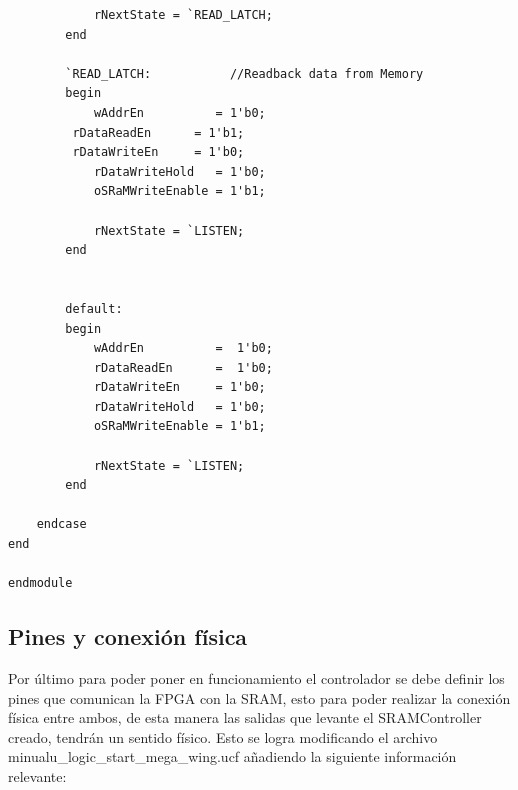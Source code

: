 \documentclass[10pt]{article}
\begin{document}
\begin{lstlisting}
			rNextState = `READ_LATCH;
		end

		`READ_LATCH:           //Readback data from Memory
		begin
			wAddrEn          = 1'b0;
         rDataReadEn      = 1'b1;
         rDataWriteEn     = 1'b0;
			rDataWriteHold   = 1'b0;
			oSRaMWriteEnable = 1'b1;

			rNextState = `LISTEN;
		end


		default:
		begin
			wAddrEn          =  1'b0;
			rDataReadEn      =  1'b0;
			rDataWriteEn     = 1'b0;
			rDataWriteHold   = 1'b0;
			oSRaMWriteEnable = 1'b1;

			rNextState = `LISTEN;
		end

	endcase
end

endmodule
\end{lstlisting}


\subsection*{Pines y conexión física}

Por último para poder poner en funcionamiento el controlador se debe definir los pines que comunican la FPGA con la SRAM, esto para poder realizar la conexión física entre ambos, de esta manera las salidas que levante el SRAMController creado, tendrán un sentido físico.
Esto se logra modificando el archivo minualu\_logic\_start\_mega\_wing.ucf añadiendo la siguiente información relevante:
\end{document}
